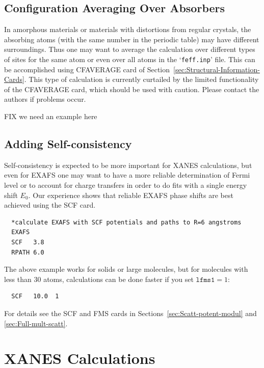 \documentclass[11pt,oneside]{report} %
\renewcommand{\htmlref}[2]{\hyperlink{#2}{#1}}
\newcommand{\file}[1]{`\texttt{#1}'}
\renewcommand{\htmlref}[2]{{#1}} %
\begin{document}
\subsection{Configuration Averaging Over Absorbers}
\label{sec:Aver-over-absorb}
In amorphous materials or materials with distortions from regular
crystals, the absorbing atoms (with the same number in the periodic table)
may have different surroundings. Thus one may want to average the
calculation over different types of sites for the same atom or even
over all atoms in the \file{feff.inp} file. This can be accomplished using
\htmlref{CFAVERAGE}{card:cfa} card of Section~\ref{sec:Structural-Information-Cards}.
This type of calculation is currently curtailed by 
the limited functionality of the CFAVERAGE card, which should be used 
with caution.  Please contact the authors if problems occur.

FIX we need an example here


\subsection{Adding Self-consistency}
\label{sec:Adding-self-cons}
Self-consistency is expected to be more important for XANES
calculations, but even for EXAFS one may want to have a more reliable
determination of Fermi level or to account for charge transfers in
order to do fits with a single energy shift $E_0$. Our experience shows
that reliable EXAFS phase shifts are best achieved using the 
\htmlref{SCF}{card:scf} card.

\begin{verbatim}
  *calculate EXAFS with SCF potentials and paths to R=6 angstroms
  EXAFS
  SCF   3.8
  RPATH 6.0
\end{verbatim}

The above example works for solids or large molecules, but for molecules with 
less than 30 atoms, calculations can be done faster if you set $\mathtt{lfms1}=1$:
\begin{verbatim}
  SCF   10.0  1
\end{verbatim}

For details see the \htmlref{SCF}{card:scf} and \htmlref{FMS}{card:fms} cards in
Sections~\ref{sec:Scatt-potent-modul} and \ref{sec:Full-mult-scatt}.


\section{XANES Calculations}
\label{sec:XANES-calculations}
\end{document}
